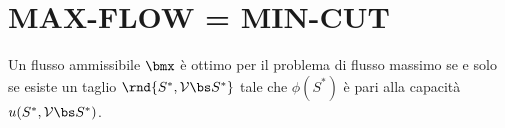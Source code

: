 \documentclass[\main/main.tex]{subfiles}
\begin{document}
\section{MAX-FLOW = MIN-CUT}
\begin{theorem}[Max-flow = Min-cut]
  Un flusso ammissibile $\bmx$ è ottimo per il problema di flusso massimo se e solo se esiste un taglio $\rnd{S^*, \mathcal{V} \bs S^*}$ tale che $\phi(S^*)$ è pari alla capacità $u(S^*, \mathcal{V} \bs S^*)$.
\end{theorem}
\end{document}
